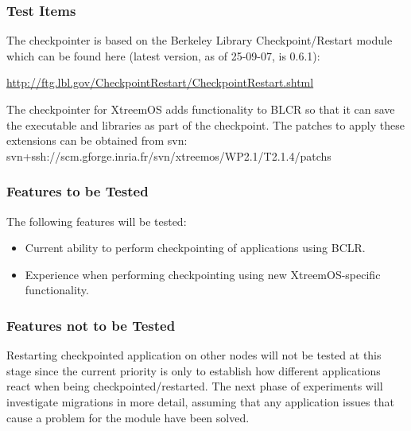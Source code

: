 \subsubsection{Test Items}
The checkpointer is based on the Berkeley Library Checkpoint/Restart
module which can be found here (latest version, as of 25-09-07, is 0.6.1):\\
\begin{center}
 \mbox{\href{http://ftg.lbl.gov/CheckpointRestart/CheckpointRestart.shtml}{http://ftg.lbl.gov/CheckpointRestart/CheckpointRestart.shtml}}
\end{center}
The checkpointer for XtreemOS adds functionality to BLCR so that it can save
the executable and libraries as part of the checkpoint. The patches to apply these extensions can be obtained from svn:\\
svn+ssh://scm.gforge.inria.fr/svn/xtreemos/WP2.1/T2.1.4/patchs


\subsubsection{Features to be Tested}
The following features will be tested:
\begin{itemize}
\item Current ability to perform checkpointing of applications using BCLR.
\item Experience when performing checkpointing using new XtreemOS-specific functionality.
\end{itemize}

\subsubsection{Features not to be Tested}
Restarting checkpointed application on other nodes will not be tested at this stage since the current priority is only to establish how different applications react when being checkpointed/restarted. The next phase of experiments will investigate migrations in more detail, assuming that any application issues that cause a problem for the module have been solved.

